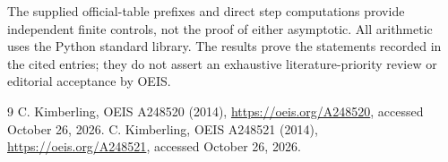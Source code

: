 \documentclass[10pt]{article}
\begin{document}
The supplied official-table prefixes and direct step computations provide
independent finite controls, not the proof of either asymptotic. All arithmetic
uses the Python standard library. The results prove the statements recorded
in the cited entries; they do not assert an exhaustive literature-priority
review or editorial acceptance by OEIS.
\begin{thebibliography}{9}
 C. Kimberling, OEIS A248520 (2014),
\url{https://oeis.org/A248520}, accessed October 26, 2026.
 C. Kimberling, OEIS A248521 (2014),
\url{https://oeis.org/A248521}, accessed October 26, 2026.
\end{thebibliography}
\end{document}
